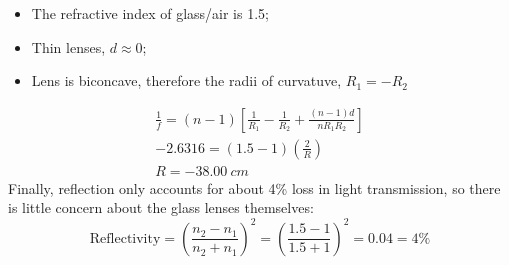 \begin{itemize}
    \item The refractive index of glass/air is 1.5;
    \item Thin lenses, $d \approx 0$;
    \item Lens is biconcave, therefore the radii of curvatuve, $R_1 = -R_2$
\end{itemize}
\begin{equation}
\begin{split}
    \frac{1}{f} = (n-1) \left[
        \frac{1}{R_1} - \frac{1}{R_2} + \frac{(n-1)d}{nR_1R_2}
    \right] \\
    -2.6316 = (1.5-1)(\frac{2}{R}) \\
    R = -\SI{38.00}{cm}
\end{split}
\end{equation}
Finally, reflection only accounts for about 4\% loss in light transmission, so there is little concern about the glass lenses themselves:
\begin{equation}
    \text{Reflectivity} = {\left( \frac{n_2-n_1}{n_2+n_1} \right)}^2 = {\left( \frac{1.5-1}{1.5+1} \right)}^2 = 0.04 = 4\%
\end{equation}